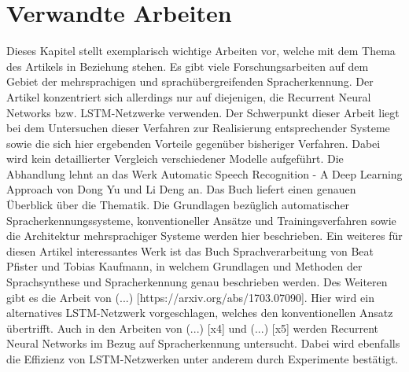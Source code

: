 \section{Verwandte Arbeiten}
Dieses Kapitel stellt exemplarisch wichtige Arbeiten vor, welche mit dem Thema des Artikels in Beziehung stehen. Es gibt viele Forschungsarbeiten auf dem Gebiet der mehrsprachigen und sprachübergreifenden Spracherkennung. Der Artikel konzentriert sich allerdings nur auf diejenigen, die Recurrent Neural Networks bzw. LSTM-Netzwerke verwenden. Der Schwerpunkt dieser Arbeit liegt bei dem Untersuchen dieser Verfahren zur Realisierung entsprechender Systeme sowie die sich hier ergebenden Vorteile gegenüber bisheriger Verfahren. Dabei wird kein detaillierter Vergleich verschiedener Modelle aufgeführt.  
Die Abhandlung lehnt an das Werk Automatic Speech Recognition - A Deep Learning Approach von Dong Yu und Li Deng \cite{Yu.2014} an. Das Buch liefert einen genauen Überblick über die Thematik. Die Grundlagen bezüglich automatischer Spracherkennungssysteme, konventioneller Ansätze und Trainingsverfahren sowie die Architektur mehrsprachiger Systeme werden hier beschrieben.
Ein weiteres für diesen Artikel interessantes Werk ist das Buch Sprachverarbeitung von Beat Pfister und Tobias Kaufmann, in welchem Grundlagen und Methoden der Sprachsynthese und Spracherkennung genau beschrieben werden.  
Des Weiteren gibt es die Arbeit von (...) [https://arxiv.org/abs/1703.07090]. Hier wird ein alternatives LSTM-Netzwerk vorgeschlagen, welches den konventionellen Ansatz übertrifft. Auch in den Arbeiten von (...) [x4] und (...) [x5] werden Recurrent Neural Networks im Bezug auf Spracherkennung untersucht. Dabei wird ebenfalls die Effizienz von LSTM-Netzwerken unter anderem durch Experimente bestätigt. 


